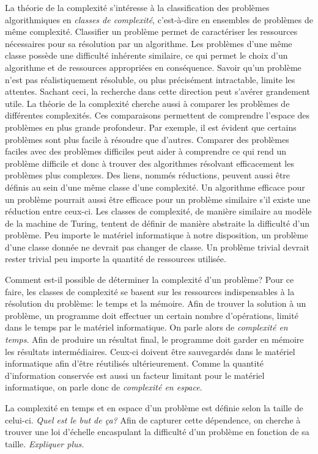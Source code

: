 La théorie de la complexité s'intéresse à la classification des problèmes algorithmiques en \textit{classes de complexité}, c'est-à-dire en ensembles de problèmes de même complexité. Classifier un problème permet de caractériser les ressources nécessaires pour sa résolution par un algorithme. Les problèmes d'une même classe possède une difficulté inhérente similaire, ce qui permet le choix d'un algorithme et de ressources appropriées en conséquence. Savoir qu'un problème n'est pas réalistiquement résoluble, ou plus précisément intractable, limite les attentes. Sachant ceci, la recherche dans cette direction peut s'avérer grandement utile. La théorie de la complexité cherche aussi à comparer les problèmes de différentes complexités. Ces comparaisons permettent de comprendre l'espace des problèmes en plus grande profondeur. Par exemple, il est évident que certains problèmes sont plus facile à résoudre que d'autres. Comparer des problèmes faciles avec des problèmes difficiles peut aider à comprendre ce qui rend un problème difficile et donc à trouver des algorithmes résolvant efficacement les problèmes plus complexes. Des liens, nommés réductions, peuvent aussi être définis au sein d'une même classe d'une complexité. Un algorithme efficace pour un problème pourrait aussi être efficace pour un problème similaire s'il existe une réduction entre ceux-ci. Les classes de complexité, de manière similaire au modèle de la machine de Turing, tentent de définir de manière abstraite la difficulté d'un problème. Peu importe le matériel informatique à notre disposition, un problème d'une classe donnée ne devrait pas changer de classe. Un problème trivial devrait rester trivial peu importe la quantité de ressources utilisée.  

Comment est-il possible de déterminer la complexité d'un problème? Pour ce faire, les classes de complexité se basent sur les ressources indispensables à la résolution du problème: le temps et la mémoire. Afin de trouver la solution à un problème, un programme doit effectuer un certain nombre d'opérations, limité dans le temps par le matériel informatique. On parle alors de \textit{complexité en temps}. Afin de produire un résultat final, le programme doit garder en mémoire les résultats intermédiaires. Ceux-ci doivent être sauvegardés dans le matériel informatique afin d'être réutilisés ultérieurement. Comme la quantité d'information conservée est aussi un facteur limitant pour le matériel informatique, on parle donc de \textit{complexité en espace}. 

La complexité en temps et en espace d'un problème est définie selon la taille de celui-ci. \textcolor{mydarkred}{\textit{Quel est le but de ça?}} Afin de capturer cette dépendence, on cherche à trouver une loi d'échelle encaspulant la difficulté d'un problème en fonction de sa taille.  \textcolor{mydarkred}{\textit{Expliquer plus.}}

